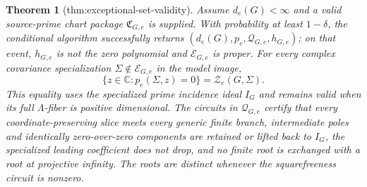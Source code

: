 \documentclass{article}
\newtheorem{theorem}{Theorem}
\begin{document}
\begin{theorem}[thm:exceptional-set-validity]\label{thm:exceptional-set-validity}
Assume \(d_e(G)<\infty\) and a valid source-prime chart package \(\mathfrak C_{G,e}\) is supplied. With probability at least \(1-\delta\), the conditional algorithm successfully returns \((d_e(G),p_e,\mathcal Q_{G,e},h_{G,e})\); on that event, \(h_{G,e}\) is not the zero polynomial and \(\mathcal E_{G,e}\) is proper. For every complex covariance specialization \(\Sigma\notin\mathcal E_{G,e}\) in the model image, \[\{z\in\mathbb C:p_e(\Sigma,z)=0\}=\mathcal Z_e(G,\Sigma).\] This equality uses the specialized prime incidence ideal \(I_G\) and remains valid when its full \(\Lambda\)-fiber is positive dimensional. The circuits in \(\mathcal Q_{G,e}\) certify that every coordinate-preserving slice meets every generic finite branch, intermediate poles and identically zero-over-zero components are retained or lifted back to \(I_G\), the specialized leading coefficient does not drop, and no finite root is exchanged with a root at projective infinity. The roots are distinct whenever the squarefreeness circuit is nonzero.
\end{theorem}
\end{document}
